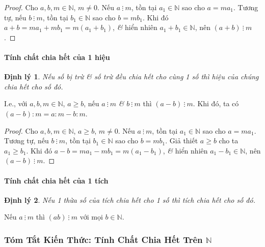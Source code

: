 \documentclass{article}
\numberwithin{equation}{section}
\newtheorem{dinhly}{Định lý}[section]
\begin{document}
\begin{proof}[Proof]
	Cho $a,b,m\in\mathbb{N}$, $m\ne 0$. Nếu $a\ \vdots\ m$, tồn tại $a_1\in\mathbb{N}$ sao cho $a = ma_1$. Tương tự, nếu $b\ \vdots\ m$, tồn tại $b_1\in\mathbb{N}$ sao cho $b = mb_1$. Khi đó $a + b = ma_1 + mb_1 = m(a_1 + b_1)$, \textit{\&} hiển nhiên $a_1 + b_1\in\mathbb{N}$, nên $(a + b)\ \vdots\ m$.
\end{proof}

\paragraph{Tính chất chia hết của 1 hiệu}
\begin{dinhly}
	Nếu số bị trừ \textit{\&} số trừ đều chia hết cho cùng 1 số thì hiệu của chúng chia hết cho số đó.
\end{dinhly}
I.e., với $a,b,m\in\mathbb{N}$, $a\ge b$, nếu $a\ \vdots\ m$ \textit{\&} $b\ \vdots\ m$ thì $(a - b)\ \vdots\ m$. Khi đó, ta có $(a - b):m = a:m - b:m$.

\begin{proof}[Proof]
	Cho $a,b,m\in\mathbb{N}$, $a\ge b$, $m\ne 0$. Nếu $a\ \vdots\ m$, tồn tại $a_1\in\mathbb{N}$ sao cho $a = ma_1$. Tương tự, nếu $b\ \vdots\ m$, tồn tại $b_1\in\mathbb{N}$ sao cho $b = mb_1$. Giả thiết $a\ge b$ cho ta $a_1\ge b_1$. Khi đó $a - b = ma_1 - mb_1 = m(a_1 - b_1)$, \textit{\&} hiển nhiên $a_1 - b_1\in\mathbb{N}$, nên $(a - b)\ \vdots\ m$.
\end{proof}

\paragraph{Tính chất chia hết của 1 tích}
\begin{dinhly}
	Nếu 1 thừa số của tích chia hết cho 1 số thì tích chia hết cho số đó.
\end{dinhly}
Nếu $a\ \vdots\ m$  thì $(ab)\ \vdots\ m$ với mọi $b\in\mathbb{N}$.

\subsubsection{Tóm Tắt Kiến Thức: Tính Chất Chia Hết Trên $\mathbb{N}$}
\end{document}
